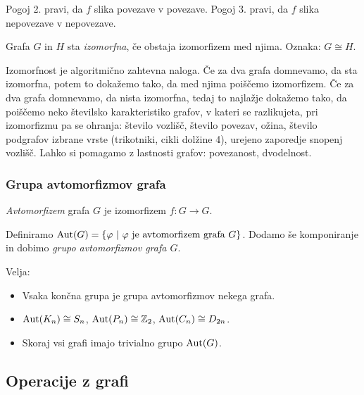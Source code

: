 \begin{opomba}
    Pogoj 2. pravi, da $f$ slika povezave v povezave. Pogoj 3. pravi, da $f$ slika nepovezave v nepovezave.
\end{opomba}

\begin{definicija}
    Grafa $G$ in $H$ sta \emph{izomorfna}, če obstaja izomorfizem med njima. Oznaka: $G \cong H$.
\end{definicija}

\begin{opomba}
    Izomorfnost je algoritmično zahtevna naloga. Če za dva grafa domnevamo, da sta izomorfna, potem to dokažemo tako, da med njima poiščemo izomorfizem. Če za dva grafa domnevamo, da nista izomorfna, tedaj to najlažje dokažemo tako, da poiščemo neko številsko karakteristiko grafov, v kateri se razlikujeta, pri izomorfizmu pa se ohranja: število vozlišč, število povezav, ožina, število podgrafov izbrane vrste (trikotniki, cikli dolžine 4), urejeno zaporedje snopenj vozlišč. Lahko si pomagamo z lastnosti grafov: povezanost, dvodelnost.
\end{opomba}

\subsubsection*{Grupa avtomorfizmov grafa}
\begin{definicija}
    \emph{Avtomorfizem} grafa $G$ je izomorfizem $f: G \to G$.
\end{definicija}

Definiramo $\operatorname{Aut} (G) = \left\{\varphi \ | \ \varphi \text{ je avtomorfizem grafa } G\right\}$. Dodamo še komponiranje in dobimo \emph{grupo avtomorfizmov grafa $G$}.

\begin{opomba}
    Velja:
    \begin{itemize}
        \item Vsaka končna grupa je grupa avtomorfizmov nekega grafa.
        \item $\operatorname{Aut}(K_n) \cong S_n$, $\operatorname{Aut}(P_n) \cong \mathbb{Z}_2$, $\operatorname{Aut}(C_n) \cong D_{2n}$.
        \item Skoraj vsi grafi imajo trivialno grupo $\operatorname{Aut}(G)$.
    \end{itemize}
\end{opomba}

\subsection{Operacije z grafi}
